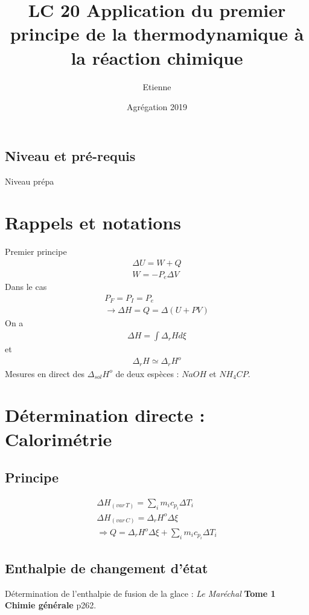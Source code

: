 \documentclass[12pt,prb,aps,epsf]{article}
\begin{document}
	
	\title{LC 20 Application du premier principe de la thermodynamique à la réaction chimique}
	\author{Etienne}
	\date{Agrégation 2019}
	\maketitle
	
	\tableofcontents
	
	\pagebreak

\subsection{Niveau et pré-requis}
Niveau prépa

\section{Rappels et notations}
Premier principe 
\begin{eqnarray}
\Delta U = W+Q\\
W = -P_e \Delta V
\end{eqnarray}
Dans le cas 
\begin{eqnarray}
P_F=P_I = P_e\\
\rightarrow\Delta H= Q = \Delta (U+PV)
\end{eqnarray}
On a  
\begin{eqnarray}
\Delta H = \int \Delta _r H d\xi
\end{eqnarray}
et 
\begin{eqnarray}
\Delta _r H \simeq \Delta _r H^o
\end{eqnarray}
Mesures en direct des $\Delta _{sol} H^o$ de deux espèces : $NaOH$ et $NH_4CP$.

\section{Détermination directe : Calorimétrie}
\subsection{Principe}
\begin{eqnarray}
\Delta H_{(var\, T)} = \sum_i m_i c_{p_i}\Delta T_i\\
\Delta H_{(var\, C)} = \Delta _r H^o \Delta\xi\\
\Longrightarrow Q = \Delta _r H^o \Delta\xi +  \sum_i m_i c_{p_i}\Delta T_i
\end{eqnarray}
\subsection{Enthalpie de changement d'état}
Détermination de l'enthalpie de fusion de la glace : \textit{Le Maréchal} \textbf{Tome 1 Chimie générale} p262.\\
\end{document}
